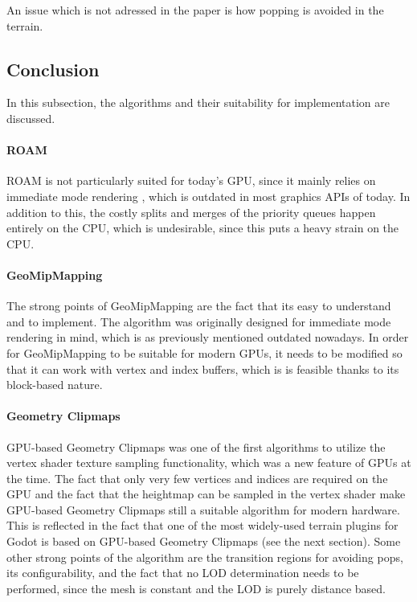 An issue which is not adressed in the paper is how popping is avoided in the terrain.

\subsection{Conclusion}
In this subsection, the algorithms and their suitability for implementation are discussed.

\paragraph{ROAM} ROAM is not particularly suited for today's GPU, since it mainly relies 
on immediate mode rendering \cite{geomclipmaps}, which is outdated in most graphics APIs of today.
In addition to this, the costly splits and merges of the priority queues happen entirely on the CPU,
which is undesirable, since this puts a heavy strain on the CPU.

\paragraph{GeoMipMapping} The strong points of GeoMipMapping are the fact that its easy to understand and 
to implement. The algorithm was originally designed for immediate mode rendering in mind, which is 
as previously mentioned outdated nowadays.
In order for GeoMipMapping to be suitable for modern GPUs, it needs to be modified so that 
it can work with vertex and index buffers, which is is feasible thanks to its block-based nature.

\paragraph{Geometry Clipmaps} GPU-based Geometry Clipmaps was one of the first algorithms to utilize 
the vertex shader texture sampling functionality, which was a new feature of GPUs at the time.
The fact that only very few vertices and indices are required on the GPU 
and the fact that the heightmap can be sampled in the vertex shader make GPU-based Geometry Clipmaps still a suitable 
algorithm for modern hardware. This is reflected in the fact that one of the most widely-used terrain plugins for Godot \cite{godotheightmapplugingithub}
is based on GPU-based Geometry Clipmaps (see the next section).
Some other strong points of the algorithm are the transition regions for avoiding pops, its configurability, and the fact that 
no LOD determination needs to be performed, since the mesh is constant and the LOD is purely distance based.


